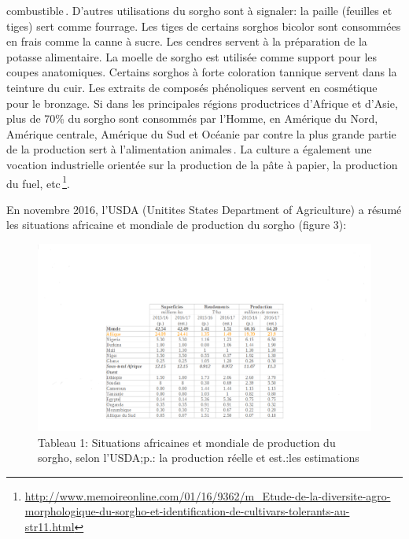 \documentclass[a4paper,11pt]{article}
\begin{document}
combustible\,\cite{SaintClair_1989}.  D’autres utilisations du sorgho
sont à signaler: la paille (feuilles et tiges) sert comme
fourrage. Les tiges de certains sorghos bicolor sont consommées en
frais comme la canne à sucre. Les cendres servent à la préparation de
la potasse alimentaire. La moelle de sorgho est utilisée comme support
pour les coupes anatomiques. Certains sorghos à forte coloration
tannique servent dans la teinture du cuir. Les extraits de composés
phénoliques servent en cosmétique pour le bronzage. Si dans les
principales régions productrices d’Afrique et d’Asie, plus de 70\% du
sorgho sont consommés par l’Homme, en Amérique du Nord, Amérique
centrale, Amérique du Sud et Océanie par contre la plus grande partie
de la production sert à l’alimentation
animales\,\cite{BARRO_KONDOMBO_2010}. La culture a également une
vocation industrielle orientée sur la production de la pâte à papier,
la production du fuel,
etc\,\footnote{\url{http://www.memoireonline.com/01/16/9362/m_Etude-de-la-diversite-agro-morphologique-du-sorgho-et-identification-de-cultivars-tolerants-au-str11.html}}.

En novembre 2016, l’USDA (Unitites States Department of Agriculture) a résumé les situations africaine et mondiale de production du sorgho (figure 3):


\begin{figure}%
  \begin{center}
   \includegraphics[width=14cm]{images/WorldSorghumStatisticsUsda}
  \end{center}
  \caption{Tableau 1: Situations africaines et mondiale de production du sorgho, selon l’USDA;p.:
    la production réelle et est.:les estimations}
\end{figure}
\end{document}
